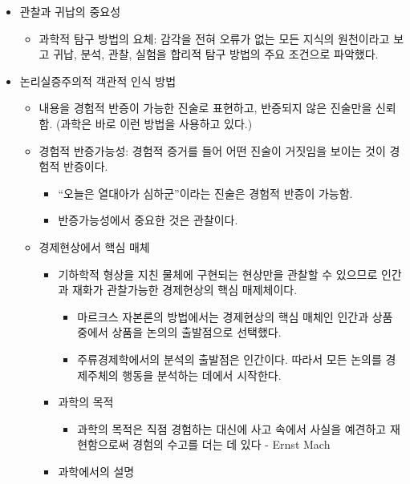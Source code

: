 \documentclass{report}
\begin{document}
\begin{itemize}
\begin{itemize}
\begin{itemize}
            \item 관찰과 귀납의 중요성
            \begin{itemize}
                \item 과학적 탐구 방법의 요체: 감각을 전혀 오류가 없는 모든 지식의 원천이라고 보고 귀납, 분석, 관찰, 실험을 합리적 탐구 방법의 주요 조건으로 파악했다.
            \end{itemize}
            \item 논리실증주의적 객관적 인식 방법
            \begin{itemize}
                \item 내용을 경험적 반증이 가능한 진술로 표현하고, 반증되지 않은 진술만을 신뢰함. (과학은 바로 이런 방법을 사용하고 있다.)
                \item 경험적 반증가능성: 경험적 증거를 들어 어떤 진술이 거짓임을 보이는 것이 경험적 반증이다.
                \begin{itemize}
                    \item ``오늘은 열대아가 심하군''이라는 진술은 경험적 반증이 가능함.
                    \item 반증가능성에서 중요한 것은 관찰이다.
                \end{itemize}
                \item 경제현상에서 핵심 매체
                \begin{itemize}
                    \item 기하학적 형상을 지친 물체에 구현되는 현상만을 관찰할 수 있으므로 인간과 재화가 관찰가능한 경제현상의 핵심 매제체이다.
                    \begin{itemize}
                        \item 마르크스 자본론의 방법에서는 경제현상의 핵심 매체인 인간과 상품 중에서 상품을 논의의 출발점으로 선택했다.
                        \item 주류경제학에서의 분석의 출발점은 인간이다. 따라서 모든 논의를 경제주체의 행동을 분석하는 데에서 시작한다.
                    \end{itemize}
                    \item 과학의 목적
                    \begin{itemize}
                        \item 과학의 목적은 직점 경험하는 대신에 사고 속에서 사실을 예견하고 재현함으로써 경험의 수고를 더는 데 있다 - Ernst Mach
                    \end{itemize}
                    \item 과학에서의 설명

\end{itemize}
\end{itemize}
\end{itemize}
\end{itemize}
\end{itemize}
\end{document}
